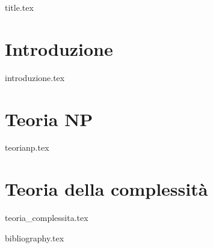 \documentclass[a4paper,11pt,oneside]{book}
\begin{document}
\frontmatter

{title.tex}

\tableofcontents

\mainmatter


\chapter{Introduzione}
{introduzione.tex}

\chapter{Teoria NP}
{teorianp.tex}

\chapter{Teoria della complessità}
{teoria_complessita.tex}

\cleardoublepage

{bibliography.tex}
\end{document}
